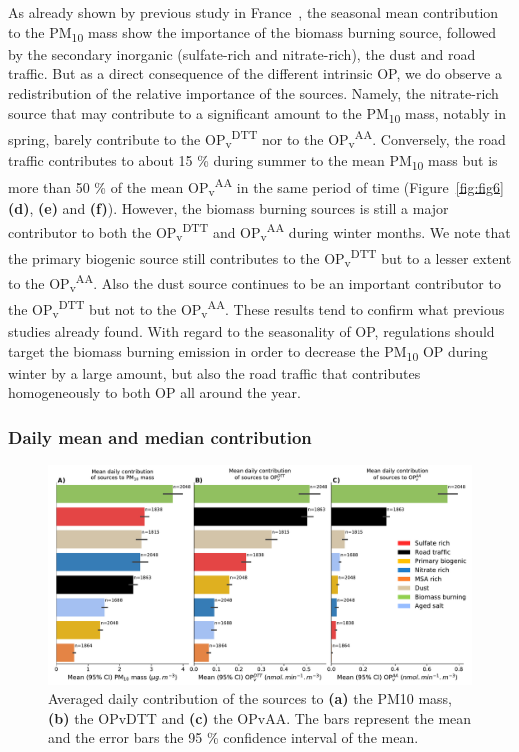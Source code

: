 \documentclass[acp]{copernicus}
\begin{document}
As already shown by previous study in
France~\citep{favezTraitement2017,petitSources2019,srivastavaSpeciation2018a,wakedSource2014,weberComparison2019},
the seasonal mean contribution to the PM\textsubscript{10} mass
show the importance of the biomass burning source, followed by the
secondary inorganic (sulfate-rich and nitrate-rich), the dust and road
traffic. But as a direct consequence of the different intrinsic OP, we
do observe a redistribution of the relative importance of the sources.
Namely, the nitrate-rich source that may contribute to a significant
amount to the PM\textsubscript{10} mass, notably in spring, barely
contribute to the OP\textsubscript{v}\textsuperscript{DTT} nor to the
OP\textsubscript{v}\textsuperscript{AA}. Conversely, the road traffic
contributes to about 15 \% during summer to the mean
PM\textsubscript{10} mass but is more than 50 \% of the mean
OP\textsubscript{v}\textsuperscript{AA} in the same period of time
(Figure~\ref{fig:fig6} \textbf{(d)},
\textbf{(e)} and \textbf{(f)}). However, the biomass burning sources is
still a major contributor to both the
OP\textsubscript{v}\textsuperscript{DTT} and
OP\textsubscript{v}\textsuperscript{AA} during winter months. We note
that the primary biogenic source still contributes to the
OP\textsubscript{v}\textsuperscript{DTT} but to a lesser extent to the
OP\textsubscript{v}\textsuperscript{AA}. Also the dust source continues
to be an important contributor to the
OP\textsubscript{v}\textsuperscript{DTT} but not to the
OP\textsubscript{v}\textsuperscript{AA}. These results tend to confirm
what previous studies already found. With regard to the seasonality of
OP, regulations should target the biomass burning emission in order to
decrease the PM\textsubscript{10} OP during winter by a large amount,
but also the road traffic that contributes homogeneously to both OP all
around the year.

\subsubsection{Daily mean and median contribution}%
\label{daily-mean-and-median-contribution}

\begin{figure}[ht]
    \centering
    \includegraphics[width=1.0\linewidth]{figures/fig7}
    \caption{
    Averaged daily contribution of the sources to \textbf{(a)} the PM10 mass, \textbf{(b)} the
    OPvDTT and \textbf{(c)} the OPvAA. The bars represent the mean and the error bars the
    95 \% confidence interval of the mean.
    }%
    \label{fig:fig7}
\end{figure}
\end{document}
